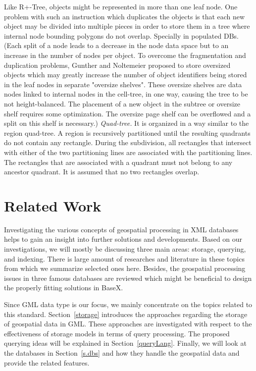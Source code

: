 \documentclass[a4paper,12pt]{article}
\begin{document}
Like R+-Tree, objects might be represented in more than one leaf node. One problem with such an instruction which duplicates the objects is that each new object may be divided into multiple pieces in order to store them in a tree where internal node bounding polygons do not overlap. Specially in populated DBs. 
(Each split of a node leads to a decrease in the node data space but to an increase in the number of nodes per object. To overcome the fragmentation and duplication problems, Gunther and Noltemeier proposed to store oversized objects which may greatly increase the number of object identifiers being stored in the leaf nodes in separate "oversize shelves". These oversize shelves are data nodes linked to internal nodes in the cell-tree, in one way, causing the tree to be not height-balanced. The placement of a new object in the subtree or oversize shelf requires some optimization. The oversize page shelf can be overflowed and a split on this shelf is necessary.)
\emph{Quad-tree.}
It is organized in a way similar to the region quad-tree. A region is recursively partitioned until the resulting quadrants do not contain any rectangle. During the subdivision, all rectangles that intersect with either of the two partitioning lines are associated with the partitioning lines. The rectangles that are associated with a quadrant must not belong to any ancestor quadrant. It is assumed that no two rectangles overlap.
\newpage








\section{Related Work}
\label{s.rwork}
Investigating the various concepts of geospatial processing in XML databases helps to gain an insight into further solutions and developments. 
Based on our investigations, we will mostly be discussing three main areas: storage, querying, and indexing. There is large amount of researches and literature in these topics from which we summarize selected ones here. Besides, the geospatial processing issues in three famous databases are reviewed which might be beneficial to design the properly fitting solutions in BaseX. %

Since GML data type is our focus, we mainly concentrate on the topics related to this standard. Section~\ref{storage} introduces the approaches regarding the storage of geospatial data in GML. 
These approaches are investigated with respect to the effectiveness of storage models in terms of query processing. The proposed querying ideas will be explained in Section~\ref{queryLang}. 
Finally, we will look at the databases in Section~\ref{s.dbs} and how they handle the geospatial data and provide the related features.
  
\end{document}
